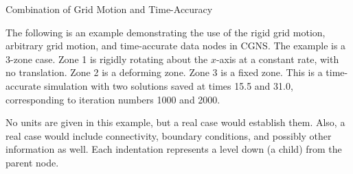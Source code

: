 \begin{example}{Combination of Grid Motion and Time-Accuracy}
\label{ex:combination}

The following is an example demonstrating the use of the rigid grid motion,
arbitrary grid motion, and time-accurate data nodes in CGNS.
The example is a 3-zone case.
Zone 1 is rigidly rotating about the $x$-axis at a constant rate, with
no translation.
Zone 2 is a deforming zone.
Zone 3 is a fixed zone.
This is a time-accurate simulation with two solutions saved at times
15.5 and 31.0, corresponding to iteration numbers 1000 and 2000.

No units are given in this example, but a real case would establish them.
Also, a real case would include connectivity, boundary conditions, and
possibly other information as well.
Each indentation represents a level down (a child) from the parent node.


\end{example}
